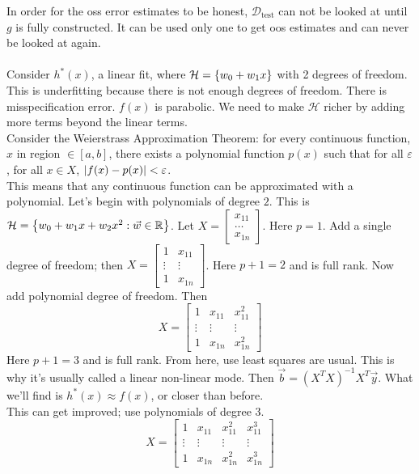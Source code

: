 \documentclass[12pt]{article}
\begin{document}
In order for the oss error estimates to be honest, $\mathcal{D}_{\text{test}}$ can not be looked at until $g$ is fully constructed. It can be used only one to get oos estimates and can never be looked at again. \\~\\
Consider $h^*(x)$, a linear fit, where $\mathcal{H} = \left\{ w_0 + w_1x \right\}$ with 2 degrees of freedom. This is underfitting because there is not enough degrees of freedom. There is misspecification error. $f(x)$ is parabolic. We need to make $\mathcal{H}$ richer by adding more terms beyond the linear terms. \\ 
Consider the Weierstrass Approximation Theorem: for every continuous function, $x$ in region $\in [a,b]$, there exists a polynomial function $p(x)$ such that for all $\varepsilon$, for all $x \in X$, $\abs{f(x) - p(x)} < \varepsilon$. \\
This means that any continuous function can be approximated with a polynomial. Let's begin with polynomials of degree $2$. This is $\mathcal{H} = \left\{ w_0 + w_1x + w_2x^2: \vec{w} \in \mathbb{R} \right\}$. Let $X = \begin{bmatrix} x_{11} \\ \dots \\ x_{1n} \end{bmatrix}$. Here $p=1$. Add a single degree of freedom; then $X = \begin{bmatrix} 1 & x_{11} \\ \vdots & \vdots \\ 1 & x_{1n} \end{bmatrix}$. Here $p+1 = 2$ and is full rank. Now add polynomial degree of freedom. Then $$X = \begin{bmatrix} 1 & x_{11} & x_{11}^2 \\ \vdots & \vdots & \vdots \\ 1 & x_{1n} & x_{1n}^2 \end{bmatrix} $$ Here $p+1 = 3$ and is full rank. From here, use least squares are usual. This is why it's usually called a linear non-linear mode. Then $\vec{b} = (X^TX)^{-1}X^T\vec{y}$. What we'll find is $h^*(x) \approx f(x)$, or closer than before. \\
This can get improved; use polynomials of degree $3$. 
$$ X = \begin{bmatrix} 1 & x_{11} & x_{11}^2 & x_{11}^3 \\ \vdots & \vdots & \vdots & \vdots \\ 1 & x_{1n} & x_{1n}^2 & x_{1n}^3 \end{bmatrix} $$ 
\end{document}
